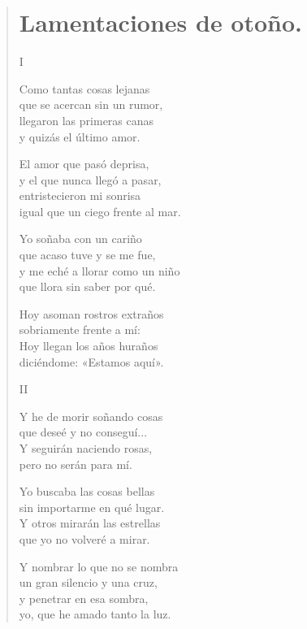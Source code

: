 \documentclass[11pt, portrait, twoside, notitlepage, openright]{book}
\begin{document}
\newpage
\begin{verse}
\begin{center}
\section{Lamentaciones de otoño.}
\end{center}
\begin{center}
I
\end{center}

Como tantas cosas lejanas\\
que se acercan sin un rumor,\\
llegaron las primeras canas\\
y quizás el último amor.
\newline

El amor que pasó deprisa,\\
y el que nunca llegó a pasar,\\
entristecieron mi sonrisa\\
igual que un ciego frente al mar.
\newline

Yo soñaba con un cariño\\
que acaso tuve y se me fue,\\
y me eché a llorar como un niño\\
que llora sin saber por qué.
\newline

Hoy asoman rostros extraños\\
sobriamente frente a mí:\\
Hoy llegan los años huraños\\
diciéndome: «Estamos aquí».
\newpage
\begin{center}
II
\end{center}

Y he de morir soñando cosas\\
que deseé y no conseguí...\\
Y seguirán naciendo rosas,\\
pero no serán para mí.
\newline

Yo buscaba las cosas bellas\\
sin importarme en qué lugar.\\
Y otros mirarán las estrellas\\
que yo no volveré a mirar.
\newline

Y nombrar lo que no se nombra\\
un gran silencio y una cruz,\\
y penetrar en esa sombra,\\
yo, que he amado tanto la luz.


\end{verse}
\end{document}
